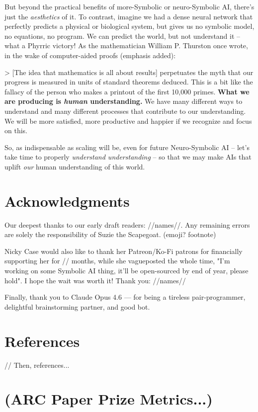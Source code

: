 \documentclass{article}
\begin{document}
But beyond the practical benefits of more-Symbolic or neuro-Symbolic AI, there's just the \textit{aesthetics} of it. To contrast, imagine we had a dense neural network that perfectly predicts a physical or biological system, but gives us no symbolic model, no equations, no program. We can predict the world, but not understand it -- what a Phyrric victory! As the mathematician William P. Thurston once wrote, in the wake of computer-aided proofs (emphasis added):

> [The idea that mathematics is all about results] perpetuates the myth that our progress is measured in units of standard theorems deduced. This is a bit like the fallacy of the person who makes a printout of the first 10,000 primes. \textbf{What we are producing is \textit{human} understanding. }We have many different ways to understand and many different processes that contribute to our understanding. We will be more satisfied, more productive and happier if we recognize and focus on this.

So, as indispensable as scaling will be, even for future Neuro-Symbolic AI -- let's take time to properly \textit{understand understanding} -- so that we may make AIs that uplift \textit{our} human understanding of this world.


\section{Acknowledgments}

Our deepest thanks to our early draft readers: //names//. Any remaining errors are solely the responsibility of Suzie the Scapegoat. (emoji? footnote)

Nicky Case would also like to thank her Patreon/Ko-Fi patrons for financially supporting her for // months, while she vagueposted the whole time, "I'm working on some Symbolic AI thing, it'll be open-sourced by end of year, please hold". I hope the wait was worth it! Thank you: //names// 

Finally, thank you to Claude Opus 4.6 — for being a tireless pair-programmer, delightful brainstorming partner, and good bot.

\section{References}

// Then, references...

\section{(ARC Paper Prize Metrics...)}
\end{document}
